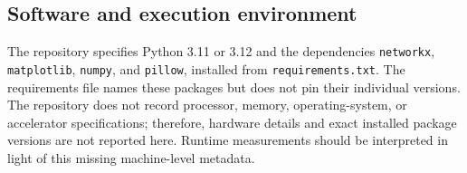 \documentclass[11pt]{article}
\begin{document}
\subsection{Software and execution environment}

The repository specifies Python 3.11 or 3.12 and the dependencies
\texttt{networkx}, \texttt{matplotlib}, \texttt{numpy}, and \texttt{pillow},
installed from \texttt{requirements.txt}. The requirements file names these
packages but does not pin their individual versions. The repository does not
record processor, memory, operating-system, or accelerator specifications;
therefore, hardware details and exact installed package versions are not
reported here. Runtime measurements should be interpreted in light of this
missing machine-level metadata.
\end{document}
